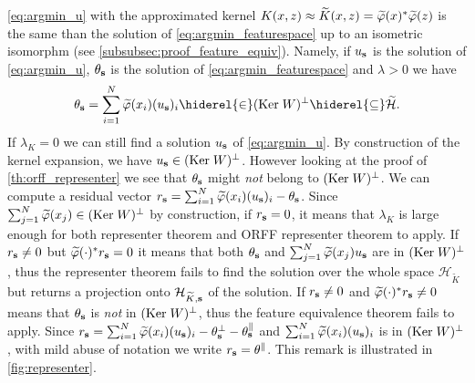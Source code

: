 \documentclass[twoside,11pt]{article}
\begin{document}
\cref{eq:argmin_u} with the approximated kernel $K(x,z) \approx
\tildeK{\omega}(x,z) = \tildePhi{\omega}(x)^\adjoint\tildePhi{\omega}(z)$ is
the same than the solution of \cref{eq:argmin_featurespace} up to an isometric
isomorphm (see \cref{subsubsec:proof_feature_equiv}). Namely, if $u_{\boldsymbol{\mathbf{s}}}$
is the solution of \cref{eq:argmin_u}, $\theta_{\boldsymbol{\mathbf{s}}}$ is the solution of
\cref{eq:argmin_featurespace} and $\lambda>0$ we have
\begin{dmath*}
    \theta_{\seq{s}} = \sum_{i=1}^{N} \tildePhi{\omega}(x_i) (u_{\seq{s}})_i
    \hiderel{\in} (\Ker W)^{\perp} \hiderel{\subseteq} \tildeH{\omega}.
\end{dmath*}
If $\lambda_K=0$ we can still find a solution $u_{\boldsymbol{\mathbf{s}}}$ of
\cref{eq:argmin_u}. By construction of the kernel expansion, we have
$u_{\boldsymbol{\mathbf{s}}}\in(\text{Ker}\; W)^\bot$. However looking at the proof of
\cref{th:orff_representer} we see that $\theta_{\boldsymbol{\mathbf{s}}}$ might \emph{not}
belong to $(\text{Ker}\; W)^\bot$. We can compute a residual vector $r_{\seq{s}} =
\sum_{i=1}^{N} \tildePhi{\omega}(x_i) (u_{\seq{s}})_i - \theta_{\seq{s}}$.
Since $\sum_{j=1}^N \tildePhi{\omega}(x_j)\in(\Ker W)^\bot$ by construction, if
$r_{\boldsymbol{\mathbf{s}}}=0$, it means that $\lambda_K$ is large enough for both representer
theorem and \acs{ORFF} representer theorem to apply. If $r_{\boldsymbol{\mathbf{s}}}\neq 0$ but
$\tildePhi{\omega}(\cdot)^\adjoint r_{\seq{s}} = 0$ it means that both
$\theta_{\boldsymbol{\mathbf{s}}}$ and $\sum_{j=1}^{N} \tildePhi{\omega}(x_j) u_{\seq{s}}$ are
in $(\text{Ker}\; W)^\bot$, thus the representer theorem fails to find the 
solution over the whole space $\mathcal{H}_{\widetilde{K}}$ but returns a
projection onto $\mathcal{H}_{\widetilde{K},\boldsymbol{\mathbf{s}}}$ of the solution. If
$r_{\boldsymbol{\mathbf{s}}} \neq 0$ and $\tildePhi{\omega}(\cdot)^\adjoint r_{\seq{s}} \neq 0$
means that $\theta_{\boldsymbol{\mathbf{s}}}$ is \emph{not} in $(\text{Ker}\; W)^\bot$, thus the
feature equivalence theorem fails to apply. Since $r_{\seq{s}} = \sum_{i=1}^N
\tildePhi{\omega}(x_i)(u_{\seq{s}})_i - \theta_{\seq{s}}^\perp -
\theta_{\seq{s}}^\parallel$ and $\sum_{i=1}^N
\tildePhi{\omega}(x_i)(u_{\seq{s}})_i$ is in $(\text{Ker}\; W)^\perp$, with mild abuse
of notation we write $r_{\boldsymbol{\mathbf{s}}}=\theta^\parallel$. This remark is illustrated
in \cref{fig:representer}.
\end{document}
